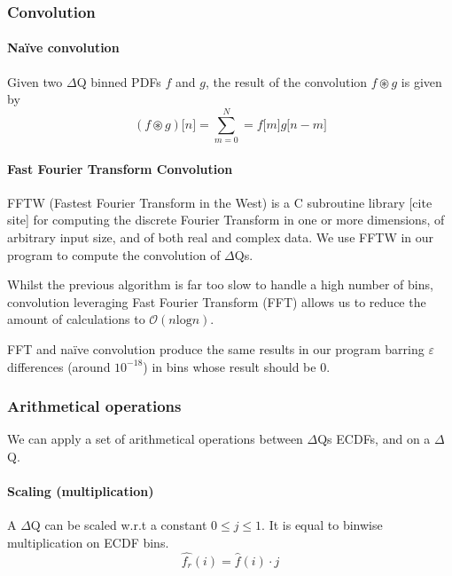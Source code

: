         \subsubsection{Convolution}
        
        \paragraph{Naïve convolution}
        Given two $\Delta$Q binned PDFs $f$ and $g$, the result of the convolution $f \circledast g$ is given by 
        \begin{equation}
            (f \circledast g)\lbrack n \rbrack = \sum_{m = 0}^{N} = f\lbrack m \rbrack g \lbrack n - m \rbrack  
            \label{eq:discconv}
        \end{equation}
            

    \paragraph{Fast Fourier Transform Convolution}
        FFTW (Fastest Fourier Transform in the West) is a C subroutine library [cite site] for computing the discrete Fourier Transform in one or more dimensions, of arbitrary input size, and of both real and complex data. We use FFTW in our program to compute the convolution of $\Delta$Qs.
    
    Whilst the previous algorithm is far too slow to handle a high number of bins, convolution leveraging Fast Fourier Transform (FFT) allows us to reduce the amount of calculations to $\mathcal{O}(n \text{log} n)$. 
    
    FFT and naïve convolution produce the same results in our program barring $\varepsilon$ differences (around $10^{-18}$) in bins whose result should be 0.

    \subsubsection{Arithmetical operations}
        We can apply a set of arithmetical operations between $\Delta$Qs ECDFs, and on a $\Delta$Q.
    \paragraph{Scaling (multiplication)} A $\Delta$Q can be scaled w.r.t a constant $0 \le j \le 1$. It is equal to binwise multiplication on ECDF bins.
    \begin{equation}
        \hat{f_r}(i) = \hat{f}(i) \cdot j
        \label{eq:mul_ecdf}
    \end{equation}

